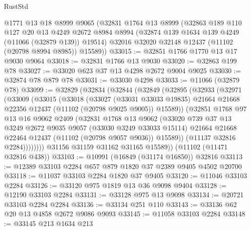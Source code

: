 \begin{lexlean}{RustStd}
\begin{coremodule}
    @1771
    @13
    @18
    @8999
    @9065
    (@32831
      @1764
      @13
      @8999
      (@32863
        @189
        @110
        @127
        @20
        @13
        @4249
        @2672
        @8984
        @8994
        (@32874 @139 @1634 @139 @4249 (@11066 (@32879 @139)) @19514)
        @32016
        @32020
        @32148
        @12437
        (@11102 (@20798 @8994 @8985))
        @15589))
@33015 := @32851 @1766 @1770 @13 @17 @9030 @9064
@33018 := @32831 @1766 @13 @9030
@33020 := @32863 @199 @78
@33027 := @33020 @623 @37 @13 @4298 @2672 @9004 @9025
@33030 := @32874 @78 @879 @78
@33031 := @33030 @4298
@33033 := @11066 (@32879 @78)
@33099 := @32829
    (@32834
      (@32844
        (@32849
          (@32895
            (@32933
              (@32971
                (@33009
                  (@33015
                    (@33018
                      (@33027
                        (@33031 @33033 @19835)
                        @21664
                        @21668
                        @22356
                        @12437
                        (@11102 (@20798 @9025 @9005))
                        @15589))
                    (@32851
                      @1768
                      @97
                      @13
                      @16
                      @9062
                      @2409
                      (@32831
                        @1768
                        @13
                        @9062
                        (@33020
                          @739
                          @37
                          @13
                          @3249
                          @2672
                          @9035
                          @9057
                          (@33030 @3249 @33033 @15114)
                          @21664
                          @21668
                          @22464
                          @12437
                          (@11102 (@20798 @9057 @9036))
                          @15589))
                      (@11137 @32816 @2284))))))))
        @31156
        @31159
        @31162
        @31165
        @15589))
    (@11102 (@11471 @32816 @438))
@33103 := @10991 (@16849 (@31174 @16850)) @32816
@33113 := @12389 @33103 @2284 @657 @879 @1820 @37 @2389 @9405 @4502 @20700
@33118 := @11037 @33103 @2284 @1820 @37 @9405
@33120 := @11046 @33103 @2284
@33126 := @33120 @975 @1819 @13 @36 @9098 @9404
@33128 := @12190 @33103 @2284
@33131 := @33128 @975 @13 @9098
@33134 := @20721 @33103 @2284 @2284
@33136 := @33134 @251 @110
@33143 := @33136 @62 @20 @13 @4858 @2672 @9086 @9093
@33145 := @11058 @33103 @2284
@33148 := @33145 @213 @1634 @213

\end{coremodule}
\end{lexlean}
